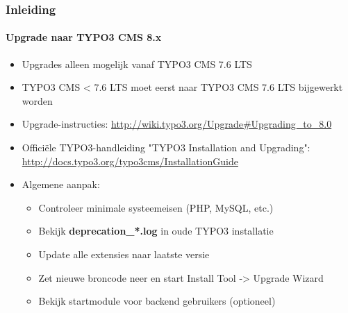 \begin{frame}[fragile]
	\frametitle{Inleiding}
	\framesubtitle{Upgrade naar TYPO3 CMS 8.x}

	\begin{itemize}
		\item Upgrades alleen mogelijk vanaf TYPO3 CMS 7.6 LTS
		\item TYPO3 CMS < 7.6 LTS moet eerst naar TYPO3 CMS 7.6 LTS bijgewerkt worden
	\end{itemize}

	\begin{itemize}

		\item Upgrade-instructies:\newline
			\smaller\url{http://wiki.typo3.org/Upgrade#Upgrading_to_8.0}\normalsize
		\item Officiële TYPO3-handleiding "TYPO3 Installation and Upgrading":
			\smaller\url{http://docs.typo3.org/typo3cms/InstallationGuide}\normalsize
		\item Algemene aanpak:
			\begin{itemize}
				\item Controleer minimale systeemeisen \small(PHP, MySQL, etc.)
				\item Bekijk \textbf{deprecation\_*.log} in oude TYPO3 installatie
				\item Update alle extensies naar laatste versie
				\item Zet nieuwe broncode neer en start Install Tool -> Upgrade Wizard
				\item Bekijk startmodule voor backend gebruikers (optioneel)
			\end{itemize}
	\end{itemize}

\end{frame}


